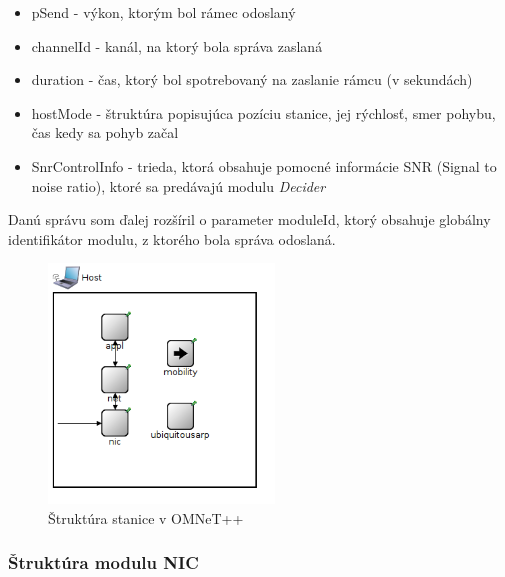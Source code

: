 \documentclass[11pt,twoside,a4paper]{book}
\begin{document}
\begin{itemize}
 \item pSend - výkon, ktorým bol rámec odoslaný
 \item channelId - kanál, na ktorý bola správa zaslaná
 \item duration - čas, ktorý bol spotrebovaný na zaslanie rámcu (v sekundách)
 \item hostMode - štruktúra popisujúca pozíciu stanice, jej rýchlosť, smer pohybu, čas kedy sa pohyb začal
 \item SnrControlInfo - trieda, ktorá obsahuje pomocné informácie SNR (Signal to noise ratio), ktoré sa predávajú modulu \textit{Decider}
\end{itemize}


Danú správu som ďalej rozšíril o parameter moduleId, ktorý obsahuje globálny identifikátor modulu, z ktorého bola správa odoslaná.

\begin{figure}[h]
 \centering
 \includegraphics[width=6cm]{./figures/host.png}
 \caption{Štruktúra stanice v OMNeT++}
 \label{fig:Host}
\end{figure}

\subsubsection{Štruktúra modulu NIC}
\end{document}
